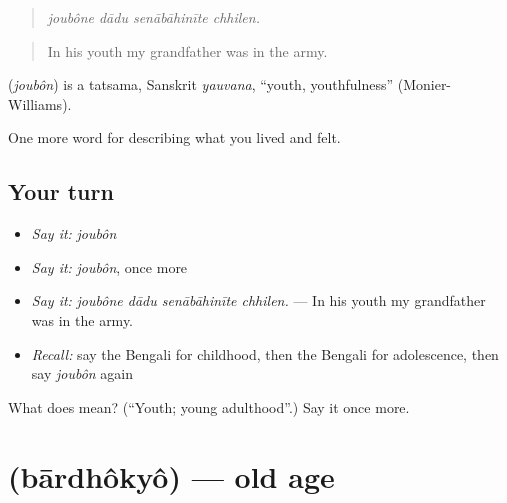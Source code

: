 \begin{quote}
   
\end{quote}

\begin{quote}
\emph{joubône dādu senābāhinīte chhilen.}
\end{quote}

\begin{quote}
In his youth my grandfather was in the army.
\end{quote}

\begin{cousinweb}
\textbf{} (\emph{joubôn}) is a tatsama, Sanskrit \emph{yauvana}, \textquotedblleft{}youth, youthfulness\textquotedblright{} (Monier-Williams).
\end{cousinweb}

\begin{grammarlens}[title={What you've built}]
One more word for describing what you lived and felt.
\end{grammarlens}

\subsection*{Your turn}
\begin{itemize}
\raggedright
  \item \emph{Say it:} \emph{joubôn}
  \item \emph{Say it:} \emph{joubôn}, once more
  \item \emph{Say it:} \emph{joubône dādu senābāhinīte chhilen.} — In his youth my grandfather was in the army.
  \item \emph{Recall:} say the Bengali for childhood, then the Bengali for adolescence, then say \emph{joubôn} again
\end{itemize}

\begin{tcolorbox}[breakable,colback=teal!4,colframe=teal!35!black,title={Before you move on}]
What does  mean? (\textquotedblleft{}Youth; young adulthood\textquotedblright{}.) Say it once more.
\end{tcolorbox}
\section[\texorpdfstring{\bn{বার্ধক্য} (bārdhôkyô)}{বার্ধক্য (bārdhôkyô)}]{ (bārdhôkyô) — old age}

\label{lesson:BN-C488-bardhokyo}



